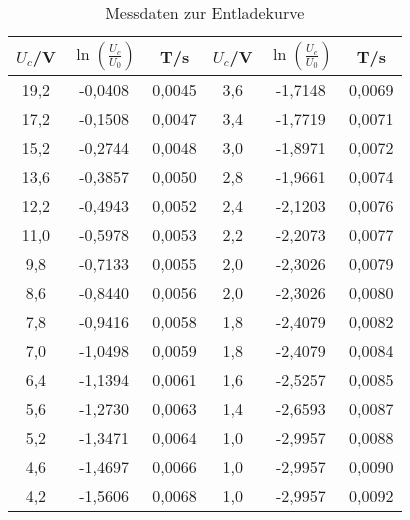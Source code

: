 


%


\begin{table}
  \centering
  \caption{Messdaten zur Entladekurve}
  \label{tab:entladekurve}
  \begin{tabular}{c c c c c c}
    \toprule
     $U_c$/V   & $\ln{\left( \frac{U_c}{U_0} \right)}$ &	T/s	 &    $U_c$/V   & $\ln{\left( \frac{U_c}{U_0} \right)}$ &	T/s	 \\
          \midrule
    19,2	&	-0,0408		 & 	0,0045  & 3,6	  &	-1,7148		 & 	0,0069    \\
    17,2	&	-0,1508		 & 	0,0047  & 3,4	  &	-1,7719		 & 	0,0071    \\
    15,2	&	-0,2744		 & 	0,0048  & 3,0	  & -1,8971	   & 	0,0072    \\
    13,6	&	-0,3857		 & 	0,0050  & 2,8	  &	-1,9661		 & 	0,0074    \\
    12,2	&	-0,4943		 & 	0,0052  & 2,4	  &	-2,1203		 & 	0,0076    \\
    11,0 	&	-0,5978		 & 	0,0053  & 2,2	  &	-2,2073		 & 	0,0077    \\
    9,8	  &	-0,7133		 &  0,0055  & 2,0	  & -2,3026		 & 	0,0079    \\
    8,6	  &	-0,8440		 &  0,0056  & 2,0	  & -2,3026		 & 	0,0080    \\
    7,8	  &	-0,9416		 &  0,0058  & 1,8	  &	-2,4079		 & 	0,0082    \\
    7,0	  & -1,0498	   &  0,0059  & 1,8	  &	-2,4079		 & 	0,0084    \\
    6,4	  &	-1,1394		 &  0,0061  & 1,6	  &	-2,5257		 & 	0,0085    \\
    5,6	  &	-1,2730		 &  0,0063  & 1,4	  &	-2,6593		 & 	0,0087    \\
    5,2	  &	-1,3471		 &  0,0064  & 1,0   &	-2,9957		 & 	0,0088    \\
    4,6	  &	-1,4697		 & 	0,0066  & 1,0   &	-2,9957		 & 	0,0090    \\
    4,2	  &	-1,5606		 & 	0,0068  & 1,0   &	-2,9957		 & 	0,0092    \\

    \bottomrule
  \end{tabular}
\end{table}

%
